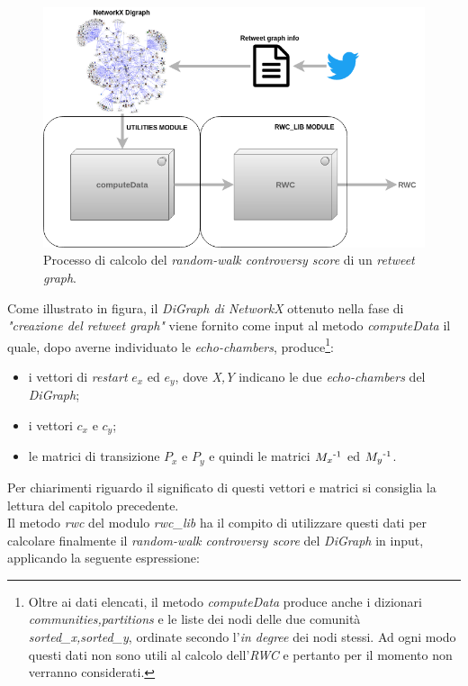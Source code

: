 \begin{figure}
\begin{center}
\includegraphics[scale=0.55]{images/calcolo_rwc.png}
\end{center}
\caption{Processo di calcolo del \textit{random-walk controversy score} di un \textit{retweet graph}.}
\label{fig:rwc}
\end{figure}
Come illustrato in figura, il \textit{DiGraph di NetworkX} ottenuto nella fase di \textit{"creazione del retweet graph"} viene fornito come input al metodo \textit{computeData} il quale, dopo averne individuato le \textit{echo-chambers}, produce\footnote{Oltre ai dati elencati, il metodo \textit{computeData} produce anche i dizionari \textit{communities,partitions} e le liste dei nodi delle due comunità \textit{sorted\_x,sorted\_y}, ordinate secondo l'\textit{in degree} dei nodi stessi. Ad ogni modo questi dati non sono utili al calcolo dell'\textit{RWC} e pertanto per il momento non verranno considerati.}:
\begin{itemize}
\item i vettori di \textit{restart} $e_x$ ed $e_y$, dove \textit{X,Y} indicano le due \textit{echo-chambers} del \textit{DiGraph}; 
\item i vettori $c_x$ e $c_y$;  
\item le matrici di transizione $P_x$ e $P_y$ e quindi le matrici $M_x\textsuperscript{-1}$ ed $M_y\textsuperscript{-1}$. 
\end{itemize}
Per chiarimenti riguardo il significato di questi vettori e matrici si consiglia la lettura del capitolo precedente.
\\Il metodo \textit{rwc} del modulo \textit{rwc\_lib} ha il compito di utilizzare questi dati per calcolare finalmente il \textit{random-walk controversy score} del \textit{DiGraph} in input, applicando la seguente espressione:
